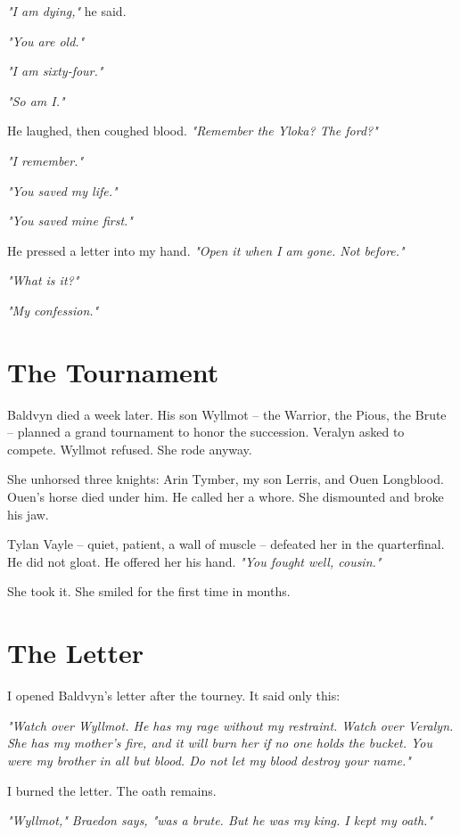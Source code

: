 \documentclass[11pt]{book}
\begin{document}
\emph{"I am dying,"} he said.

\emph{"You are old."}

\emph{"I am sixty‑four."}

\emph{"So am I."}

He laughed, then coughed blood. \emph{"Remember the Yloka? The ford?"}

\emph{"I remember."}

\emph{"You saved my life."}

\emph{"You saved mine first."}

He pressed a letter into my hand. \emph{"Open it when I am gone. Not before."}

\emph{"What is it?"}

\emph{"My confession."}

\section*{The Tournament}
Baldvyn died a week later. His son Wyllmot -- the Warrior, the Pious, the Brute -- planned a grand tournament to honor the succession. Veralyn asked to compete. Wyllmot refused. She rode anyway.

She unhorsed three knights: Arin Tymber, my son Lerris, and Ouen Longblood. Ouen's horse died under him. He called her a whore. She dismounted and broke his jaw.

Tylan Vayle -- quiet, patient, a wall of muscle -- defeated her in the quarterfinal. He did not gloat. He offered her his hand. \emph{"You fought well, cousin."}

She took it. She smiled for the first time in months.

\section*{The Letter}
I opened Baldvyn's letter after the tourney. It said only this:

\emph{"Watch over Wyllmot. He has my rage without my restraint. Watch over Veralyn. She has my mother's fire, and it will burn her if no one holds the bucket. You were my brother in all but blood. Do not let my blood destroy your name."}

I burned the letter. The oath remains.

\vspace{1em}
\noindent\textit{"Wyllmot," Braedon says, "was a brute. But he was my king. I kept my oath."}

\clearpage
\end{document}
